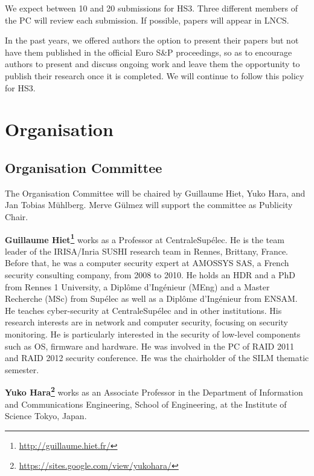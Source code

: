 \documentclass[a4paper,11pt]{article}
\begin{document}
We expect between 10 and 20 submissions for HS3. Three different members of the PC will review each submission.  If
possible, papers will appear in LNCS.

In the past years, we offered authors the option to present their papers but
not have them published in the official Euro S\&P proceedings, so as to
encourage authors to present and discuss ongoing work and leave them the
opportunity to publish their research once it is completed. We will continue to follow
this policy for HS3.


\section{Organisation}
%
\subsection{Organisation Committee}
%
The Organisation Committee will be chaired by Guillaume Hiet, Yuko Hara, and Jan Tobias
M\"uhlberg. Merve G\"ulmez will support the committee as Publicity Chair.

\textbf{Guillaume Hiet\footnote{\url{http://guillaume.hiet.fr/}}} works as a
Professor at CentraleSupélec. He is the team leader of the IRISA/Inria SUSHI research
team in Rennes, Brittany, France. Before that, he was a computer security
expert at AMOSSYS SAS, a French security consulting company, from 2008 to
2010. He holds an HDR and a PhD from Rennes 1 University, a Diplôme d'Ingénieur (MEng)
and a Master Recherche (MSc) from Supélec as well as a Diplôme d'Ingénieur
from ENSAM. He teaches cyber-security at CentraleSupélec and in other
institutions. His research interests are in network and computer security,
focusing on security monitoring. He is particularly interested in the
security of low-level components such as OS, firmware and hardware. He was
involved in the PC of RAID 2011 and RAID 2012 security conference. He was
the chairholder of the SILM thematic semester.

\textbf{Yuko Hara\footnote{\url{https://sites.google.com/view/yukohara/}}}  works as an Associate Professor in the Department of Information and Communications Engineering, School of Engineering, at the Institute of Science Tokyo, Japan.
\end{document}
